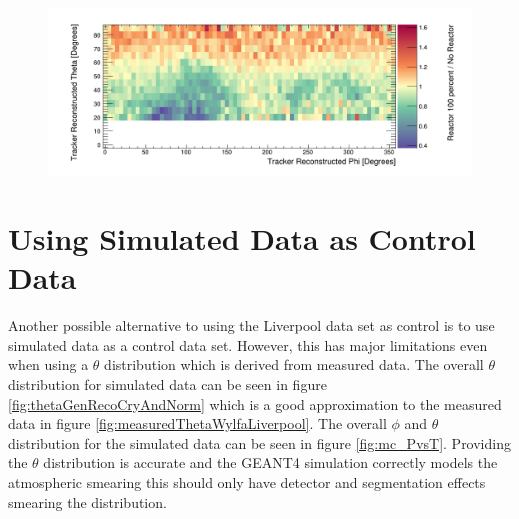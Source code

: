 \begin{figure}[!h]
 \centering
 \includegraphics[width=\linewidth]{Chapter6/Figs/simulatedMeasuredCut20Bars.png}
 \label{fig:20CutRatioWylfaDivLiv}
\end{figure}

\clearpage
\section{Using Simulated Data as Control Data}\label{sec:usingSimulatedDataAsControlData}
Another possible alternative to using the Liverpool data set as control is to use simulated data as a control data set. However, this has major limitations even when using a $\theta$ distribution which is derived from measured data. The overall $\theta$ distribution for simulated data can be seen in figure \ref{fig:thetaGenRecoCryAndNorm} which is a good approximation to the measured data in figure \ref{fig:measuredThetaWylfaLiverpool}. The overall $\phi$ and $\theta$ distribution for the simulated data can be seen in figure \ref{fig:mc_PvsT}. Providing the $\theta$ distribution is accurate and the GEANT4 simulation correctly models the atmospheric smearing this should only have detector and segmentation effects smearing the distribution. 


